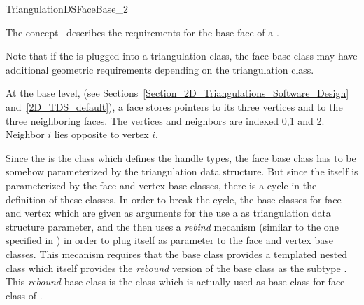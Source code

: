 

\begin{ccRefConcept}{TriangulationDSFaceBase_2}


\ccDefinition
The concept \ccRefName\ describes the requirements for
the base face of a .

Note that if  the  
is plugged  into a triangulation class, 
the face base class may have  additional geometric
requirements depending on the triangulation class.

At the base level, 
(see Sections~\ref{Section_2D_Triangulations_Software_Design} 
and~\ref{2D_TDS_default}),
a  face stores  pointers
 to its three vertices  and to the three neighboring faces.
The vertices and neighbors are indexed 0,1 and 2.
Neighbor $i$ lies opposite to vertex $i$.

Since the  is the class 
which defines the handle
types, the face base class has to be somehow 
parameterized by the triangulation
data structure.  But since the 
itself is parameterized by the face and vertex
base classes, there is a cycle in the definition of these classes.  
In order
to break the cycle, the base classes for face and vertex  which are given as
arguments for the  
use a  as triangulation
data structure parameter, and the
 then uses a {\it rebind}  mecanism (similar to the one specified in
) in order to plug itself 
as parameter to the face and vertex  base classes. 
This mecanism requires that the base class  provides
a templated nested class  which
itself provides the {\it rebound} version of the base class
as the subtype .
 This {\it rebound} base class is  the class
which is actually  used as base class for face  class
of .



\end{ccRefConcept}
